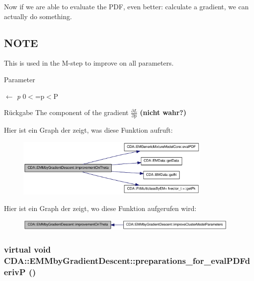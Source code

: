 Now if we are able to evaluate the PDF, even better: calculate a gradient, we can actually do something. 

\hypertarget{GaussianMixtureModel1D_8h_09_09_NOTE}{}\subsection{NOTE}\label{GaussianMixtureModel1D_8h_09_09_NOTE}
This is used in the M-\/step to improve on all parameters.


\begin{DoxyParams}{Parameter}
\item[\mbox{$\leftarrow$} {\em p}]0$<$=p$<$P\end{DoxyParams}
\begin{DoxyReturn}{Rückgabe}
The component of the gradient $\frac{\partial L}{\partial p}$ {\bfseries (nicht wahr?)} 
\end{DoxyReturn}


Hier ist ein Graph der zeigt, was diese Funktion aufruft:\nopagebreak
\begin{figure}[H]
\begin{center}
\leavevmode
\includegraphics[width=271pt]{classCDA_1_1EMMbyGradientDescent_a9069cb24c24f1c6021d749bd4e0dd7e6_cgraph}
\end{center}
\end{figure}




Hier ist ein Graph der zeigt, wo diese Funktion aufgerufen wird:\nopagebreak
\begin{figure}[H]
\begin{center}
\leavevmode
\includegraphics[width=312pt]{classCDA_1_1EMMbyGradientDescent_a9069cb24c24f1c6021d749bd4e0dd7e6_icgraph}
\end{center}
\end{figure}


\hypertarget{classCDA_1_1EMMbyGradientDescent_ad089403a73bd611cec7b40da92e4adb9}{
\subsubsection[{preparations\_\-for\_\-evalPDFderivP}]{\setlength{\rightskip}{0pt plus 5cm}virtual void CDA::EMMbyGradientDescent::preparations\_\-for\_\-evalPDFderivP ()}}
\label{classCDA_1_1EMMbyGradientDescent_ad089403a73bd611cec7b40da92e4adb9}


